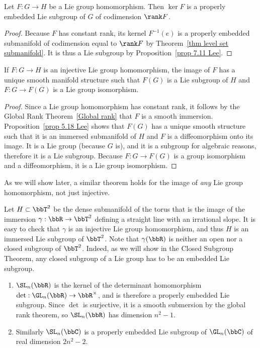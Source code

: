 \begin{prop}
    Let $F:G\to H$ be a Lie group homomorphism. Then $\ker F$ is a properly embedded Lie subgroup of $G$ of codimension $\rank F$.
\end{prop}
\begin{proof}
    Because $F$ has constant rank, its kernel $F^{-1}(e)$ is a properly embedded submanifold of codimension equal to $\rank F$ by Theorem~\ref{thm level set submanifold}. It is thus a Lie subgroup by Proposition~\ref{prop 7.11 Lee}.
\end{proof}

\begin{prop}
    If $F:G\to H$ is an injective Lie group homomorphism, the image of $F$ has a unique smooth manifold structure such that $F(G)$ is a Lie subgroup of $H$ and $F:G\to F(G)$ is a Lie group isomorphism.
\end{prop}
\begin{proof}
    Since a Lie group homomorphism has constant rank, it follows by the Global Rank Theorem~\ref{Global rank} that $F$ is a smooth immersion. Proposition~\ref{prop 5.18 Lee} shows that $F(G)$ has a unique smooth structure such that it is an immersed submanifold of $H$ and $F$ is a diffeomorphism onto its image. It is a Lie group (because $G$ is), and it is a subgroup for algebraic reasons, therefore it is a Lie subgroup. Because $F:G\to F(G)$ is a group isomorphism and a diffeomorphism, it is a Lie group isomorphism.
\end{proof}
\begin{rem}
    As we will show later, a similar theorem holds for the image of \emph{any} Lie group homomorphism, not just injective.
\end{rem}

\begin{example}
    Let $H\subset \bbT^2$ be the dense submanifold of the torus that is the image of the immersion $\gamma:\bbR\to\bbT^2$ defining a straight line with an irrational slope. It is easy to check that $\gamma$ is an injective Lie group homomorphism, and thus $H$ is an immersed Lie subgroup of $\bbT^2$. Note that $\gamma(\bbR)$ is neither an open nor a closed subgroup of $\bbT^2$. Indeed, as we will show in the Closed Subgroup Theorem, any closed subgroup of a Lie group has to be an embedded Lie subgroup.
\end{example}

\begin{example}
    \begin{enumerate}[label=(\alph*)]
        \item $\SL_n(\bbR)$ is the kernel of the determinant homomorphism $\det:\GL_n(\bbR)\to \bbR^\times$, and is therefore a properly embedded Lie subgroup. Since $\det$ is surjective, it is a smooth submersion by the global rank theorem, so $\SL_n(\bbR)$ has dimension $n^2-1$.
        \item Similarly $\SL_n(\bbC)$ is a properly embedded Lie subgroup of $\GL_n(\bbC)$ of real dimension $2n^2-2$.
    \end{enumerate}
\end{example}

